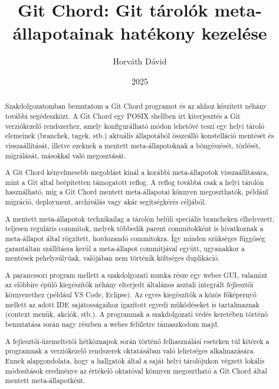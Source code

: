 \documentclass[
]{elteikthesis}[2025/03/25]
\title{Git Chord: Git tárolók meta-állapotainak hatékony kezelése}
\date{2025}
\author{Horváth Dávid}
\affiliation{egyetemi adjunktus}
\begin{document}

\listoftodos
\cleardoublepage

\maketitle
\cleardoublepage

\renewcommand{\abstractname}{Témabejelentő}

\begin{abstract}
Szakdolgozatomban bemutatom a Git Chord programot és az ahhoz készített néhány további segédeszközt.
A Git Chord egy POSIX shellben írt kiterjesztés a Git
verziókezelő rendszerhez, amely konfigurálható módon lehetővé teszi egy helyi tároló elemeinek
(branchek, tagek, stb.)
aktuális állapotából összeálló konstelláció mentését és visszaállítását,
illetve ezeknek a mentett meta-állapotoknak a böngészését, törlését, migrálását, másokkal való megosztását.

A Git Chord kényelmesebb megoldást kínál a korábbi meta-állapotok visszaállítására,
mint a Git által beépítetten támogatott reflog.
A reflog továbbá csak a helyi tárolón használható,
míg a Git Chord mentett meta-állapotai könnyen megoszthatók,
például migráció, deployment, archiválás vagy akár segítségkérés céljából.

A mentett meta-állapotok technikailag a tárolón belüli
speciális brancheken elhelyezett, teljesen reguláris commitok,
melyek többedik parent commitokként is hivatkoznak a meta-állapot által rögzített, hordozandó commitokra.
Így minden szükséges függőség garantáltan szállításra kerül a meta-állapot commitjával együtt,
ugyanakkor a mentések pehelysúlyúak, valójában nem történik költséges duplikáció.

A parancssori program mellett a szakdolgozati munka része egy webes GUI,
valamint az előbbire épülő kiegészítők néhány elterjedt
általános asztali integrált fejlesztői környezethez (például VS Code, Eclipse).
Az egyes kiegészítők a közös főképernyő mellett
az adott IDE sajátosságaihoz igazított egyedi működéseket is tartalmaznak (context menük, akciók, stb.).
A programnak a szakdolgozati védés keretében történő bemutatása során
nagy részben a webes felületre támaszkodom majd.

A fejlesztői-üzemeltetői hétköznapok során történő felhasználási eseteken túl
kitérek a programnak a verziókezelő rendszerek oktatásában való lehetséges alkalmazására.
Ennek alapgondolata, hogy a hallgatók által
a saját helyi tárolójukon végzett lokális módosítások eredménye
az értékelő oktatóval könnyen megosztható a Git Chord által mentett meta-állapotként.
\end{abstract}
\end{document}
